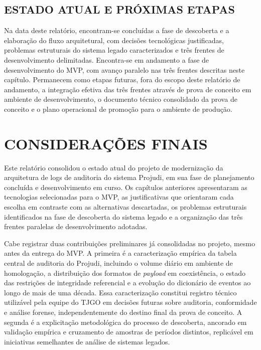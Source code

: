 \documentclass[12pt,letterpaper,oneside]{report}
\begin{document}
\section{ESTADO ATUAL E PRÓXIMAS ETAPAS}

Na data deste relatório, encontram-se concluídas a fase de descoberta e a elaboração do fluxo arquitetural, com decisões tecnológicas justificadas, problemas estruturais do sistema legado caracterizados e três frentes de desenvolvimento delimitadas. Encontra-se em andamento a fase de desenvolvimento do MVP, com avanço paralelo nas três frentes descritas neste capítulo. Permanecem como etapas futuras, fora do escopo deste relatório de andamento, a integração efetiva das três frentes  através de prova de conceito em ambiente de desenvolvimento, o documento técnico consolidado da prova de conceito e o plano operacional de promoção para o ambiente de produção.


\chapter{CONSIDERAÇÕES FINAIS}

Este relatório consolidou o estado atual do projeto de modernização da arquitetura de logs de auditoria do sistema Projudi, em sua fase de planejamento concluída e desenvolvimento em curso. Os capítulos anteriores apresentaram as tecnologias selecionadas para o MVP, as justificativas que orientaram cada escolha em contraste com as alternativas descartadas, os problemas estruturais identificados na fase de descoberta do sistema legado e a organização das três frentes paralelas de desenvolvimento adotadas.

Cabe registrar duas contribuições preliminares já consolidadas no projeto, mesmo antes da entrega do MVP. A primeira é a caracterização empírica da tabela central de auditoria do Projudi, incluindo o volume diário em ambiente de homologação, a distribuição dos formatos de \textit{payload} em coexistência, o estado das restrições de integridade referencial e a evolução do dicionário de eventos ao longo de mais de uma década. Essa caracterização constitui registro técnico utilizável pela equipe do TJGO em decisões futuras sobre auditoria, conformidade e análise forense, independentemente do destino final da prova de conceito. A segunda é a explicitação metodológica do processo de descoberta, ancorado em validação empírica e cruzamento de amostras de períodos distintos, replicável em iniciativas semelhantes de análise de sistemas legados.
\end{document}
